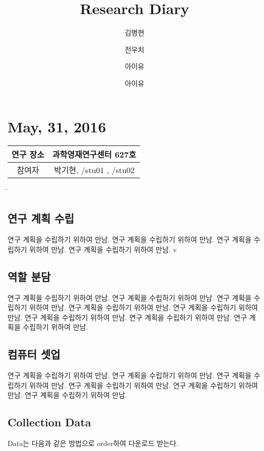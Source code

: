 \documentclass{research-note-v1.0}
\author[1] {김병현} %
\author[2] {전우치} %
\author[3] {아이유} %
\author[4] {아이유} %
\begin{document}
	\title{Research Diary}
		
	\section*{May, 31, 2016}
	\begin{table}[h]
		\centering
			\hspace{3}
		\begin{tabular}{c|c} \hline
			연구 장소   &   과학영재연구센터 627호  \\ \hline
			참여자   &   박기현, /stu01 , /stu02  \\ \hline
		\end{tabular}
	\end{table}

\begin{tabbing}
	\hspace{3}\=\kill
	\> 
\end{tabbing} 

	\subsection*{연구 계획 수립}
							연구 계획을 수립하기 위하여 만남.
							연구 계획을 수립하기 위하여 만남.
								연구 계획을 수립하기 위하여 만남.
									연구 계획을 수립하기 위하여 만남.
									v
	
    \subsection*{역할 분담}
			연구 계획을 수립하기 위하여 만남.
				연구 계획을 수립하기 위하여 만남.
					연구 계획을 수립하기 위하여 만남.
						연구 계획을 수립하기 위하여 만남.
							연구 계획을 수립하기 위하여 만남.
								연구 계획을 수립하기 위하여 만남.
									연구 계획을 수립하기 위하여 만남.
										연구 계획을 수립하기 위하여 만남.
	\subsection*{컴퓨터 셋업}
		연구 계획을 수립하기 위하여 만남.
			연구 계획을 수립하기 위하여 만남.
				연구 계획을 수립하기 위하여 만남.
					연구 계획을 수립하기 위하여 만남.
						연구 계획을 수립하기 위하여 만남.
							연구 계획을 수립하기 위하여 만남.

	\subsection*{Collection Data}
     Data는 다음과 같은 방법으로 order하여 다운로드 받는다.
\end{document}

